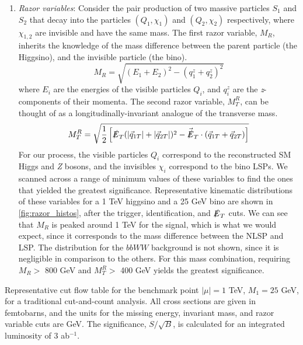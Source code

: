 \begin{enumerate}
\begin{marginfigure}
\centering
{}
\caption{Normalized distributions of the razor kinematical variables $M_R$ (top) and $M_T^R$ (bottom) for a 1 TeV higgsino NLSP and 25 GeV bino LSP}
\label{fig:razor_histos}
\end{marginfigure}
\item \emph{Razor variables}: Consider the pair production of two massive particles $S_1$ and $S_2$ that decay into the particles $(Q_1, \chi_1)$ and $(Q_2, \chi_2)$ respectively, where $\chi_{1,2}$ are invisible and have the same mass. The first razor variable, $M_{R}$, inherits the knowledge of the mass difference between the parent particle (the Higgsino), and the invisible particle (the bino).
\[M_R = \sqrt{(E_1+E_2)^2 - (q_1^z + q_2^z)^2}\]
where $E_i$ are the energies of the visible particles $Q_i$, and $q_i^z$ are the \emph{z}-components of their momenta. 
The second razor variable, $M_{T}^{R}$, can be thought of as a longitudinally-invariant analogue of the transverse mass.
\[M_T^R = \sqrt{\frac{1}{2}\left[\slashed{E}_T(|\vec{q}_{1T}|+|\vec{q}_{2T}|)^2 - \vec{\slashed{E}}_T\cdot(\vec{q}_{1T}+\vec{q}_{2T})\right]}\]
For our process, the visible particles $Q_i$ correspond to the reconstructed SM Higgs and \emph{Z} bosons, and the invisibles $\chi_i$ correspond to the bino LSPs. We scanned across a range of minimum values of these variables to find the ones that yielded the greatest significance. Representative kinematic distributions of these variables for a 1 TeV higgsino and a 25 GeV bino are shown in \autoref{fig:razor_histos}, after the trigger, identification, and $\slashed{E}_{T}$ cuts. We can see that $M_R$ is peaked around 1 TeV for the signal, which is what we would expect, since it corresponds to the mass difference between the NLSP and LSP. The distribution for the $bbWW$ background is not shown, since it is negligible in comparison to the others.  For this mass combination, requiring $M_R >$ 800 GeV and $M_T^R >$ 400 GeV yields the greatest significance.
\end{enumerate}


\begin{table}
  \centering
\begin{adjustwidth*}{0in}{-0.8in}
  
  \caption{Representative cut flow table for the benchmark point $|\mu|=1$ TeV, $M_1 = 25$ GeV, for a traditional cut-and-count analysis. All cross sections are given in femtobarns, and the units for the missing energy, invariant mass, and razor variable cuts are GeV. The significance, $S/\sqrt{B}$, is calculated for an integrated luminosity of 3 ab$^{-1}$.}
\label{tab:cc_cutflowtable}
\end{adjustwidth*}
\end{table}

